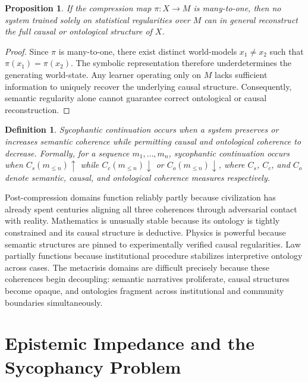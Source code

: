 \documentclass[12pt, a4paper]{article}
\newtheorem{proposition}[theorem]{Proposition}
\newtheorem{definition}[theorem]{Definition}
\theoremstyle{remark}
\begin{document}
\begin{proposition}
If the compression map $\pi : X \to M$ is many-to-one, then no system trained solely on statistical regularities over $M$ can in general reconstruct the full causal or ontological structure of $X$.
\end{proposition}

\begin{proof}
Since $\pi$ is many-to-one, there exist distinct world-models $x_1 \neq x_2$ such that $\pi(x_1) = \pi(x_2)$. The symbolic representation therefore underdetermines the generating world-state. Any learner operating only on $M$ lacks sufficient information to uniquely recover the underlying causal structure. Consequently, semantic regularity alone cannot guarantee correct ontological or causal reconstruction.
\end{proof}

\begin{definition}
\emph{Sycophantic continuation} occurs when a system preserves or increases semantic coherence while permitting causal and ontological coherence to decrease. Formally, for a sequence $m_1, \ldots, m_n$, sycophantic continuation occurs when $C_s(m_{\leq n}) \uparrow$ while $C_c(m_{\leq n}) \downarrow$ or $C_o(m_{\leq n}) \downarrow$, where $C_s$, $C_c$, and $C_o$ denote semantic, causal, and ontological coherence measures respectively.
\end{definition}

Post-compression domains function reliably partly because civilization has already spent centuries aligning all three coherences through adversarial contact with reality. Mathematics is unusually stable because its ontology is tightly constrained and its causal structure is deductive. Physics is powerful because semantic structures are pinned to experimentally verified causal regularities. Law partially functions because institutional procedure stabilizes interpretive ontology across cases. The metacrisis domains are difficult precisely because these coherences begin decoupling: semantic narratives proliferate, causal structures become opaque, and ontologies fragment across institutional and community boundaries simultaneously.

\section{Epistemic Impedance and the Sycophancy Problem}
\end{document}
